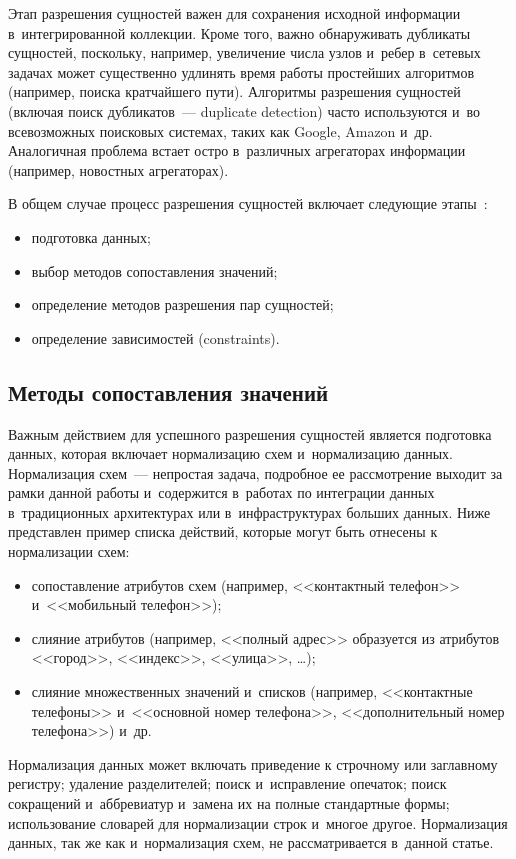 \begin{multicols}{2}
  Этап разрешения сущностей важен для сохранения исходной информации
в~интегрированной коллекции. Кроме того, важно обнаруживать дуб\-ли\-ка\-ты сущностей,
поскольку, например, увеличение числа узлов и~ребер в~сетевых задачах может
существенно удлинять время работы простейших алгоритмов (например, поиска
кратчайшего пути). Алгоритмы разрешения сущностей (включая поиск дубликатов~---
duplicate detection) часто используются и~во всевозможных поисковых системах, таких как
Google, Amazon и~др. Аналогичная проблема встает остро в~различных агрегаторах
информации (например, новостных агрегаторах).

В общем случае процесс разрешения сущностей включает следующие этапы~\cite{8-vov}:
\begin{itemize}
\item подготовка данных;
\item выбор методов сопоставления значений;
\item определение методов разрешения пар сущностей;
\item определение зависимостей (constraints).
\end{itemize}

  \subsection{Методы сопоставления значений}

  Важным действием для успешного разрешения сущностей является подготовка данных,
которая включает нормализацию схем и~нормализацию данных. Нормализация схем~---
непростая задача, подробное ее рассмотрение выходит за рамки данной работы
и~содержится в~работах по интеграции данных в~традиционных архитектурах или
в~инфраструктурах больших данных. Ниже представлен пример списка действий, которые
могут быть отнесены к нормализации схем:
  \begin{itemize}
\item сопоставление атрибутов схем (например, <<контактный телефон>>
и~<<мобильный телефон>>);
\item слияние атрибутов (например, <<полный адрес>> образуется из атрибутов
<<город>>, <<индекс>>, <<улица>>, \ldots);
\item слияние множественных значений и~списков (например, <<контактные телефоны>>
и~<<основной номер телефона>>, <<дополнительный номер телефона>>)
 и~др.
\end{itemize}

  Нормализация данных может включать приведение к строчному или заглавному регистру;
удаление разделителей; поиск и~исправление опечаток; поиск сокращений и~аббревиатур
и~замена их на полные стандартные формы; использование словарей для нормализации
строк и~многое другое. Нормализация данных, так же как и~нормализация схем, не
рассматривается в~данной статье.


\end{multicols}
